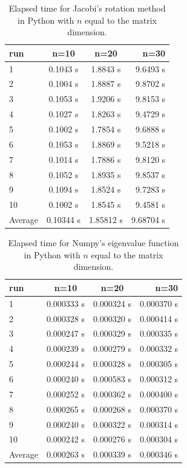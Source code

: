 \documentclass{article}
\begin{document}
\begin{table}[H]
    \centering
    \begin{tabular}{|l|c|c|r|}
    \hline
     run & n=10 & n=20 & n=30\\
     \hline
      1  & 0.1043 s & 1.8843 s & 9.6493 s\\
      2  & 0.1004 s & 1.8887 s & 9.8702 s\\
      3  & 0.1053 s & 1.9206 s & 9.8153 s\\
      4  & 0.1027 s & 1.8263 s & 9.4729 s\\
      5  & 0.1002 s & 1.7854 s & 9.6888 s\\
      6  & 0.1053 s & 1.8869 s & 9.5218 s\\
      7  & 0.1014 s & 1.7886 s & 9.8120 s\\
      8  & 0.1052 s & 1.8935 s & 9.8537 s\\
      9  & 0.1094 s & 1.8524 s & 9.7283 s\\
      10 & 0.1002 s & 1.8545 s & 9.4581 s\\
      \hline
      Average & 0.10344 s & 1.85812  s & 9.68704 s\\
      \hline
    \end{tabular}
    \caption{Elapsed time for Jacobi's rotation method in Python with $n$ equal to the matrix dimension.}
    \label{timeusedjacobi}
\end{table}

\begin{table}[H]
    \centering
    \begin{tabular}{|l|c|c|r|}
    \hline
     run & n=10 & n=20 & n=30 \\
     \hline
      1  & 0.000333 s & 0.000324 s & 0.000370 s\\
      2  & 0.000328 s & 0.000320 s & 0.000414 s\\
      3  & 0.000247 s & 0.000329 s & 0.000335 s\\
      4  & 0.000239 s & 0.000279 s & 0.000332 s\\
      5  & 0.000244 s & 0.000328 s & 0.000305 s\\
      6  & 0.000240 s & 0.000583 s & 0.000312 s\\
      7  & 0.000252 s & 0.000362 s & 0.000400 s\\
      8  & 0.000265 s & 0.000268 s & 0.000370 s\\
      9  & 0.000240 s & 0.000322 s & 0.000314 s\\
      10 & 0.000242 s & 0.000276 s & 0.000304 s\\
      \hline
      Average & 0.000263 s & 0.000339 s & 0.000346 s\\
      \hline
    \end{tabular}
    \caption{Elapsed time for Numpy's eigenvalue function in Python with $n$ equal to the matrix dimension.}
    \label{timeusednumpy}
\end{table}
\end{document}
